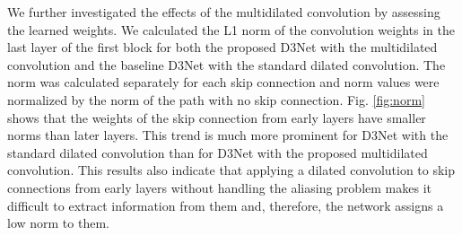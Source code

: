 \documentclass{article}
\begin{document}
\begin{table*}[t]
\caption{\label{tab:mssex} {\it Comparison of models that use external data for training. SDR values are for MUSDB18 test set. '*' denotes method operating in time domain.}}
\vspace{2mm}
\end{table*} 
We further investigated the effects of the multidilated convolution by assessing the learned weights.
We calculated the L1 norm of the convolution weights in the last layer of the first block for both the proposed D3Net with the multidilated convolution and the baseline D3Net with the standard dilated convolution. The norm was calculated separately for each skip connection and norm values were normalized by the norm of the path with no skip connection. Fig. \ref{fig:norm} shows that the weights of the skip connection from early layers have smaller norms than later layers. This trend is much more prominent for D3Net with the standard dilated convolution than for D3Net with the proposed multidilated convolution. This results also indicate that applying a dilated convolution to skip connections from early layers without handling the aliasing problem makes it difficult to extract information from them and, therefore, the network assigns a low norm to them.
\end{document}
